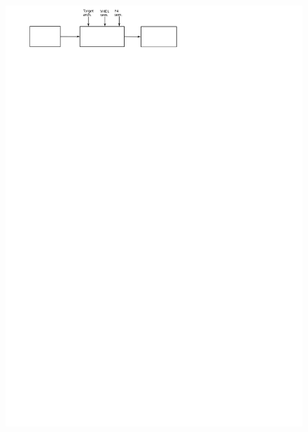 \begin{frame}[allowframebreaks]
    \begin{figure}
        \centering
        \includegraphics[scale=0.709]{pic/p4-to-vhdl-relations}
    \end{figure}
\end{frame}

